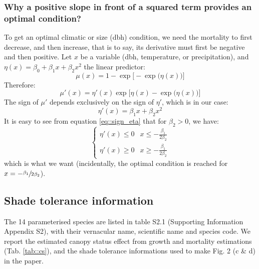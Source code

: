 \documentclass[letterpaper, 12pt]{article}
\theoremstyle{theo}
\begin{document}
\begin{refsection}
\begin{onehalfspace}
\subsubsection{Why a positive slope in front of a squared term provides an optimal condition?}
To get an optimal climatic or size (dbh) condition, we need the mortality to first decrease, and then increase, that is to say, its derivative must first be negative and then positive. Let $ x $ be a variable (dbh, temperature, or precipitation), and $ \eta(x) = \beta_0 + \beta_1 x + \beta_2 x^2 $ the linear predictor:
\[
	\mu(x) = 1 - \exp \Big[ -\exp \big(\eta(x) \big) \Big]
\]
Therefore:
\[
	\mu'(x) = \eta'(x) \exp \Big[ \eta(x) -\exp \big(\eta(x) \big) \Big]
\]
The sign of $ \mu' $ depends exclusively on the sign of $ \eta' $, which is in our case:
\begin{equation}\label{eq::sign_eta}
	\eta'(x) = \beta_1 x + \beta_2 x^2
\end{equation}
It is easy to see from equation \eqref{eq::sign_eta} that for $ \beta_2 > 0 $, we have:
\[
	\begin{cases}
		\eta'(x) \leqslant 0 & x \leqslant -\frac{\beta_1}{2\beta_2} \\
		\eta'(x) \geqslant 0 & x \geqslant -\frac{\beta_1}{2\beta_2}
	\end{cases}
\]
which is what we want (incidentally, the optimal condition is reached for $ x = -\sfrac{\beta_1}{2\beta_2}$).

\subsection{Shade tolerance information}
The 14 parameterised species are listed in table S2.1 (Supporting Information Appendix S2), with their vernacular name, scientific name and species code. We report the estimated canopy status effect from growth and mortality estimations (Tab. \ref{tab::cs}), and the shade tolerance informations \citet{Burns1990, Burns1990a} used to make Fig. 2 (c \& d) in the paper.


\end{onehalfspace}
\end{refsection}
\end{document}

